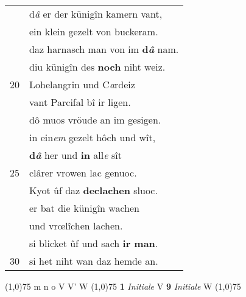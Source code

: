 \documentclass[8pt,a4paper,notitlepage]{article}
\begin{document}
\begin{table}[ht]
\begin{minipage}[t]{0.5\linewidth}
\begin{tabular}{rl}
 & d\textit{â} er der künigîn kamern vant,\\ 
 & ein klein gezelt von buckeram.\\ 
 & daz harnasch man von im \textbf{d\textit{â}} nam.\\ 
 & diu künigîn des \textbf{noch} niht weiz.\\ 
20 & Lohelangrin und C\textit{a}rdeiz\\ 
 & vant Parcifal bî ir ligen.\\ 
 & dô muos vröude an im gesigen.\\ 
 & in ein\textit{em} gezelt hôch und wît,\\ 
 & \textbf{d\textit{â}} her und \textbf{in} all\textit{e} sît\\ 
25 & clârer vrowen lac genuoc.\\ 
 & Kyot ûf daz \textbf{declachen} sluoc.\\ 
 & er bat die künigîn wachen\\ 
 & und vrœlîchen lachen.\\ 
 & si blicket ûf und sach \textbf{ir man}.\\ 
30 & si het niht wan daz hemde an.\\ 
\end{tabular}
\scriptsize
\line(1,0){75} \newline
m n o V V' W \newline
\line(1,0){75} \newline
\textbf{1} \textit{Initiale} V  \textbf{9} \textit{Initiale} W  \newline
\line(1,0){75} \newline

\end{minipage}
\end{table}
\end{document}
